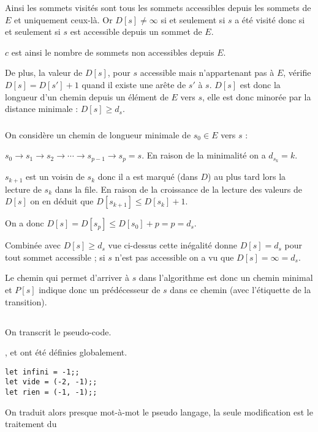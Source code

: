 Ainsi les sommets visités sont tous les sommets accessibles depuis les sommets de $E$ et uniquement ceux-là. Or $D[s] \ne \infty$ si et seulement si $s$ a été visité donc si et seulement si $s$ est accessible depuis un sommet de $E$.

\medskip

$c$ est ainsi le nombre de sommets non accessibles depuis $E$.

De plus, la valeur de $D[s]$, pour $s$ accessible mais n'appartenant pas à $E$, vérifie $D[s] = D[s']+1$ quand il existe une arête de $s'$ à $s$. $D[s]$ est donc la longueur d'un chemin depuis un élément de $E$ vers $s$, elle est donc minorée par la distance minimale : $D[s] \ge d_s$.
\subsubsection{}
On considère un chemin de longueur minimale de $s_0\in E$ vers $s$ :

$s_0 \rightarrow s_1 \rightarrow s_2 \rightarrow \cdots \rightarrow s_{p-1} \rightarrow s_p=s$.
En raison de la minimalité on a $d_{s_k} = k$.

$s_{k+1}$ est un voisin de $s_k$ donc il a est marqué (dans $D$) au plus tard lors la lecture de $s_k$ dans la file. En raison de la croissance de la lecture des valeurs de $D[s]$ on en déduit que $D[s_{k+1}]\le D[s_k]+1$.

On a donc $D[s]=D[s_p] \le D[s_0]+p=p=d_s$.

Combinée avec $D[s]\ge d_s$ vue ci-dessus cette inégalité donne $D[s]= d_s$ pour tout sommet accessible ; si $s$ n'est pas accessible on a vu que $D[s]= \infty = d_s$.

Le chemin qui permet d'arriver à $s$ dans l'algorithme est donc un chemin minimal et $P[s]$ indique donc un prédécesseur de $s$ dans ce chemin (avec l'étiquette de la transition).
\subsection{}
On transcrit le pseudo-code.

,  et  ont été définies globalement.
\begin{lstlisting}
let infini = -1;; 
let vide = (-2, -1);; 
let rien = (-1, -1);;
\end{lstlisting}
On traduit alors presque mot-à-mot le pseudo langage, la seule modification est le traitement du 

